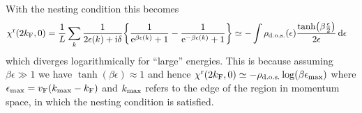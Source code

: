 \documentclass[english, parskip=full]{scrartcl}
\begin{document}
With the nesting condition this becomes
\begin{align}
\chi^\r(2\kf,0) &= \frac{1}{L} \sum_k \frac{1}{2\epsilon(k) + \i\delta} \klc*{\frac{1}{\powe{\beta\epsilon(k)} + 1} - \frac{1}{\powe{-\beta\epsilon(k)} + 1}} \simeq -\int \rho_\Text{d.o.s.}(\epsilon) \frac{\tanh\kla*{\beta\frac{\epsilon}{2}}}{2\epsilon}\,\d\epsilon
\end{align}
which diverges logarithmically for ``large'' energies.
This is because assuming $\beta\epsilon \gg 1$ we have $\tanh(\beta\epsilon) \approx 1$ and hence $\chi^\r(2\kf,0) \simeq -\rho_\Text{d.o.s.} \log \kla*{\beta\epsilon_\Text{max}}$ where $\epsilon_\Text{max} = \vf \kla*{k_\Text{max} - \kf}$ and $k_{\text{max}}$ refers to the edge of the region in momentum space, in which the nesting condition is satisfied.
\end{document}
